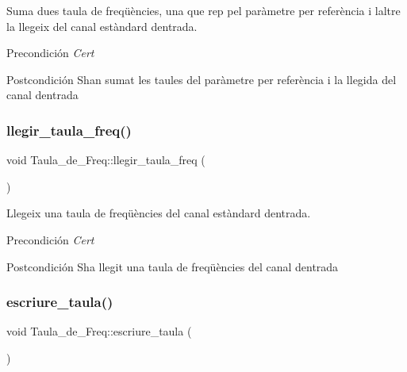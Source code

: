 Suma dues taula de freqüències, una que rep pel paràmetre per referència i l\textquotesingle{}altre la llegeix del canal estàndard d\textquotesingle{}entrada. 

\begin{DoxyPrecond}{Precondición}
{\itshape Cert} 
\end{DoxyPrecond}
\begin{DoxyPostcond}{Postcondición}
S\textquotesingle{}han sumat les taules del paràmetre per referència i la llegida del canal d\textquotesingle{}entrada 
\end{DoxyPostcond}
\mbox{\label{class_taula__de___freq_ac7e0b22823475bacb7a8556ae1d92041}} 
\subsubsection{\texorpdfstring{llegir\+\_\+taula\+\_\+freq()}{llegir\_taula\_freq()}}
{\footnotesize\ttfamily void Taula\+\_\+de\+\_\+\+Freq\+::llegir\+\_\+taula\+\_\+freq (\begin{DoxyParamCaption}{ }\end{DoxyParamCaption})}



Llegeix una taula de freqüències del canal estàndard d\textquotesingle{}entrada. 

\begin{DoxyPrecond}{Precondición}
{\itshape Cert} 
\end{DoxyPrecond}
\begin{DoxyPostcond}{Postcondición}
S\textquotesingle{}ha llegit una taula de freqüències del canal d\textquotesingle{}entrada 
\end{DoxyPostcond}
\mbox{\label{class_taula__de___freq_a2455dc33e7299c2c68ab06f967df8e60}} 
\subsubsection{\texorpdfstring{escriure\+\_\+taula()}{escriure\_taula()}}
{\footnotesize\ttfamily void Taula\+\_\+de\+\_\+\+Freq\+::escriure\+\_\+taula (\begin{DoxyParamCaption}{ }\end{DoxyParamCaption})}



